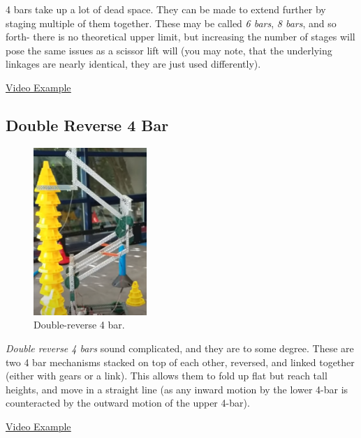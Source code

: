 \documentclass[10pt,letterpaper]{book}
\begin{document}
4 bars take up a lot of dead space. They can be made to extend further by staging multiple of them together. These may be called \textit{6 bars}, \textit{8 bars}, and so forth- there is no theoretical upper limit, but increasing the number of stages will pose the same issues as a scissor lift will (you may note, that the underlying linkages are nearly identical, they are just used differently).

\href{https://www.youtube.com/watch?v=twwNv4easgk}{\color{red}\underline{Video Example}}

\subsection{Double Reverse 4 Bar}

\begin{figure}[H]
	\includegraphics[height=2.5in]{imgs/double_reverse_4bar.png}
	\caption{Double-reverse 4 bar.}
\end{figure}

\textit{Double reverse 4 bars} sound complicated, and they are to some degree. These are two 4 bar mechanisms stacked on top of each other, reversed, and linked together (either with gears or a link). This allows them to fold up flat but reach tall heights, and move in a straight line (as any inward motion by the lower 4-bar is counteracted by the outward motion of the upper 4-bar).

\href{https://www.youtube.com/watch?v=iFq8dKUZOww}{\color{red}\underline{Video Example}}

\end{document}

